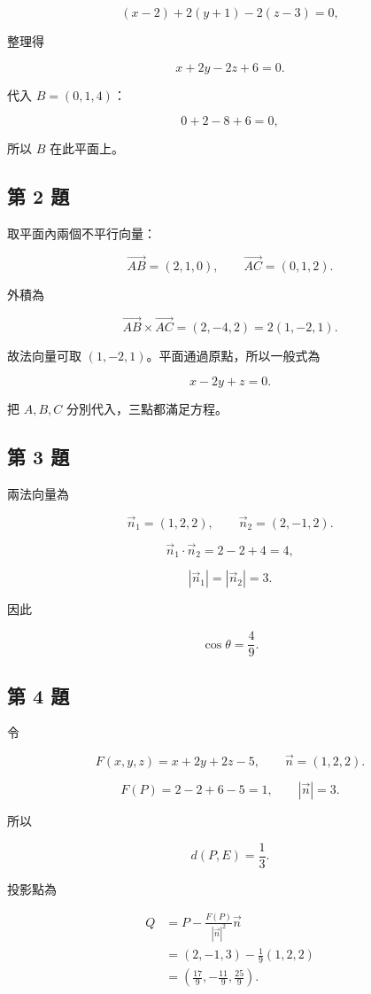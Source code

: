 \documentclass[11pt,a4paper]{article}
\begin{document}
\[
(x-2)+2(y+1)-2(z-3)=0,
\]

整理得

\[
\boxed{x+2y-2z+6=0}.
\]

代入 \(B=(0,1,4)\)：

\[
0+2-8+6=0,
\]

所以 \(B\) 在此平面上。

\subsection{第 2 題}\label{ux7b2c-2-ux984c}

取平面內兩個不平行向量：

\[
\overrightarrow{AB}=(2,1,0),\qquad
\overrightarrow{AC}=(0,1,2).
\]

外積為

\[
\overrightarrow{AB}\times\overrightarrow{AC}
=(2,-4,2)=2(1,-2,1).
\]

故法向量可取 \((1,-2,1)\)。平面通過原點，所以一般式為

\[
\boxed{x-2y+z=0}.
\]

把 \(A,B,C\) 分別代入，三點都滿足方程。

\subsection{第 3 題}\label{ux7b2c-3-ux984c}

兩法向量為

\[
\vec n_1=(1,2,2),\qquad \vec n_2=(2,-1,2).
\]

\[
\vec n_1\cdot\vec n_2=2-2+4=4,
\]

\[
|\vec n_1|=|\vec n_2|=3.
\]

因此

\[
\boxed{\cos\theta=\frac49}.
\]

\subsection{第 4 題}\label{ux7b2c-4-ux984c}

令

\[
F(x,y,z)=x+2y+2z-5,
\qquad \vec n=(1,2,2).
\]

\[
F(P)=2-2+6-5=1,
\qquad |\vec n|=3.
\]

所以

\[
\boxed{d(P,E)=\frac13}.
\]

投影點為

\[
\begin{aligned}
Q
&=P-\frac{F(P)}{|\vec n|^2}\vec n\\
&=(2,-1,3)-\frac19(1,2,2)\\
&=\boxed{\left(\frac{17}{9},-\frac{11}{9},\frac{25}{9}\right)}.
\end{aligned}
\]
\end{document}
